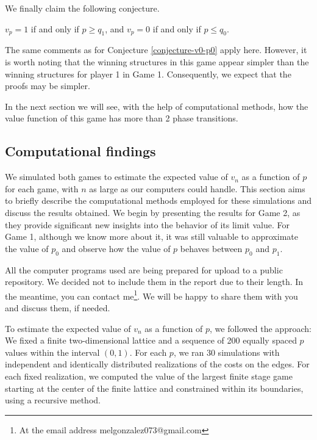        We finally claim the following conjecture. 
        \begin{conjecture}\label{conjecture-v0-q0}
           $v_p = 1$ if and only if $p \geq q_1$, and $v_p = 0$ if and only if $p \leq q_0$.
        \end{conjecture}
        The same comments as for Conjecture \ref{conjecture-v0-p0} apply here. However, it is worth noting that the winning structures in this game appear simpler than the winning structures for player 1 in Game 1. Consequently, we expect that the proofs may be simpler.

        In the next section we will see, with the help of computational methods, how the value function of this game has more than 2 phase transitions.

    \subsection{Computational findings}

        We simulated both games to estimate the expected value of $v_n$ as a function of $p$ for each game, with $n$ as large as our computers could handle. This section aims to briefly describe the computational methods employed for these simulations and discuss the results obtained. We begin by presenting the results for Game 2, as they provide significant new insights into the behavior of its limit value. For Game 1, although we know more about it, it was still valuable to approximate the value of $p_0$ and observe how the value of $p$ behaves between $p_0$ and $p_1$. 
        
        All the computer programs used are being prepared for upload to a public repository. We decided not to include them in the report due to their length. In the meantime, you can contact me\footnote{At the email address melgonzalez073@gmail.com}. We will be happy to share them with you and discuss them, if needed.

        To estimate the expected value of $v_n$ as a function of $p$, we followed the approach: We fixed a finite two-dimensional lattice and a sequence of 200 equally spaced $p$ values within the interval $(0, 1)$. For each $p$, we ran 30 simulations with independent and identically distributed realizations of the costs on the edges. For each fixed realization, we computed the value of the largest finite stage game starting at the center of the finite lattice and constrained within its boundaries, using a recursive method.
        
